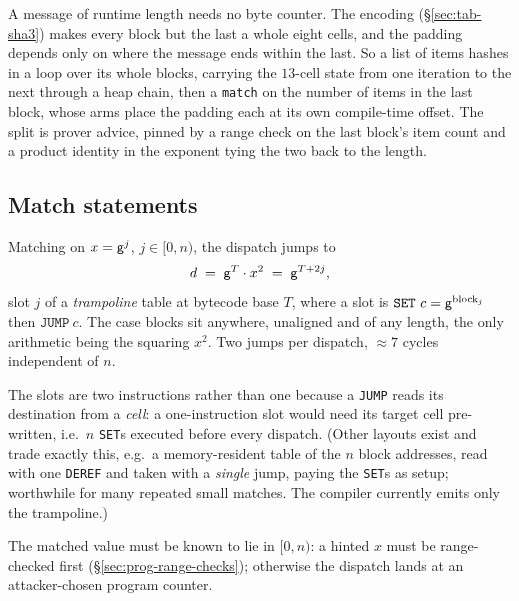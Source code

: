 A message of runtime length needs no byte counter. The encoding (\S\ref{sec:tab-sha3}) makes every block but the last a whole eight cells, and the padding depends only on where the message ends within the last. So a list of items hashes in a loop over its whole blocks, carrying the $13$-cell state from one iteration to the next through a heap chain, then a \texttt{match} on the number of items in the last block, whose arms place the padding each at its own compile-time offset. The split is prover advice, pinned by a range check on the last block's item count and a product identity in the exponent tying the two back to the length.

\subsection{Match statements}\label{sec:prog-match}

Matching on $x=\mathsf{g}^{j}$, $j\in[0,n)$, the dispatch jumps to
\[
  d \;=\; \mathsf{g}^{T}\cdot x^{2} \;=\; \mathsf{g}^{T+2j},
\]
slot $j$ of a \emph{trampoline} table at bytecode base $T$, where a slot is $\texttt{SET}\ c=\gen^{\mathrm{block}_j}$ then $\texttt{JUMP}\ c$. The case blocks sit anywhere, unaligned and of any length, the only arithmetic being the squaring $x^{2}$. Two jumps per dispatch, $\approx7$ cycles independent of $n$.

The slots are two instructions rather than one because a \texttt{JUMP} reads its destination from a \emph{cell}: a one-instruction slot would need its target cell pre-written, i.e.\ $n$ \texttt{SET}s executed before every dispatch. (Other layouts exist and trade exactly this, e.g.\ a memory-resident table of the $n$ block addresses, read with one \texttt{DEREF} and taken with a \emph{single} jump, paying the \texttt{SET}s as setup; worthwhile for many repeated small matches. The compiler currently emits only the trampoline.)

The matched value must be known to lie in $[0,n)$: a hinted $x$ must be range-checked first (\S\ref{sec:prog-range-checks}); otherwise the dispatch lands at an attacker-chosen program counter.

